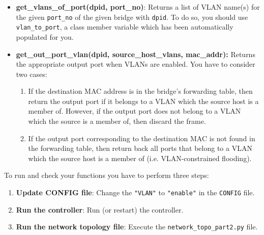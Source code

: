 \documentclass[11pt]{article}
\begin{document}
\begin{itemize}
    \item \textbf{get\_vlans\_of\_port(dpid, port\_no)}: Returns a list of VLAN name(s) for the given \texttt{port\_no} of the given bridge with \texttt{dpid}. To do so, you should use \texttt{vlan\_to\_port}, a class member variable which has been automatically populated for you.

    \item \textbf{get\_out\_port\_vlan(dpid, source\_host\_vlans, mac\_addr):} Returns the appropriate output port when VLANs are enabled. You have to consider two cases:\\
    \begin{enumerate}
        \item If the destination MAC address is in the bridge's forwarding table, then return the output port if it belongs to a VLAN which the source host is a member of. However, if the output port does not belong to a VLAN which the source is a member of, then discard the frame.
        \item If the output port corresponding to the destination MAC is not found in the forwarding table, then return back all ports that belong to a VLAN which the source host is a member of (i.e. VLAN-constrained flooding).
    \end{enumerate}

\end{itemize}

To run and check your functions you have to perform three steps:
\begin{enumerate}
    \item \textbf{Update CONFIG file}: Change the \texttt{"VLAN"} to \texttt{"enable"} in the \texttt{CONFIG} file.
    \item \textbf{Run the controller}: Run (or restart) the controller.
    \item \textbf{Run the network topology file}: Execute the \texttt{network\_topo\_part2.py} file.
\end{enumerate}
\end{document}
